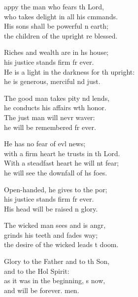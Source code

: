 \settowidth{\versewidth}{He is a light in the darkness for the upright: *}
\begin{psalmverse}%
  \begin{patverse}
appy the man who fears th Lord,\Med\\
who takes delight in all his cmmands.\\
His sons shall be powerful n earth;\Med\\
the children of the upright re blessed.

Riches and wealth are in hs house;\Med\\
his justice stands firm fr ever.\\
He is a light in the darkness for th upright:\Med\\
he is generous, merciful nd just.

The good man takes pity nd lends,\Med\\
he conducts his affairs wth honor.\\
The just man will nevr waver:\Med\\
he will be remembered fr ever.

He has no fear of evl news;\Med\\
with a firm heart he trusts in th Lord.\\
With a steadfast heart he will nt fear;\Med\\
he will see the downfall of hs foes.

Open-handed, he gives to the por;\Flex\\
his justice stands firm fr ever.\Med\\
His head will be raised n glory.

The wicked man sees and is angr,\Flex\\
grinds his teeth and fades way;\Med\\
the desire of the wicked leads t doom.

Glory to the Father and to th Son,\Med\\
and to the Hol Spirit:\\
as it was in the beginning, s now,\Med\\
and will be forever. men. 
  \end{patverse}
\end{psalmverse}
